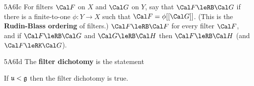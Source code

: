 \spheader 5A6Ic 
For filters $\Cal F$ on $X$ and $\Cal G$ on $Y$, 
say that $\Cal F\leRB\Cal G$ if there is a finite-to-one $\phi:Y\to X$ such
that $\Cal F=\phi[[\Cal G]]$.    (This is the {\bf Rudin-Blass ordering} of
filters.)   $\Cal F\leRB\Cal F$ for every 
filter $\Cal F$, 
and if $\Cal F\leRB\Cal G$ and $\Cal G\leRB\Cal H$ then
$\Cal F\leRB\Cal H$ (and $\Cal F\leRK\Cal G$).

\spheader 5A6Id The {\bf filter dichotomy} is the statement


\noindent

If $\frak u<\frak g$ then the filter dichotomy is true.

